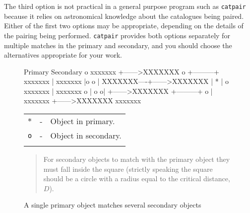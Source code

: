 \documentclass[twoside,11pt]{starlink}
\begin{document}
The third option is not practical in a general purpose program such as
\texttt{catpair} because it relies on astronomical knowledge about the
catalogues being paired. Either of the first two options may be
appropriate, depending on the details of the pairing being performed.
\texttt{catpair} provides both options separately for multiple matches in
the primary and secondary, and you should choose the alternatives
appropriate for your work.

\begin{figure}[htbp]

\begin{terminalv}
                                        Primary           Secondary
                         o              xxxxxxx    +------>XXXXXXX
            o    +---------+            xxxxxxx    |       xxxxxxx
                 |o     o  |            XXXXXXX----+------>XXXXXXX
                 |    *    |  o         xxxxxxx    |       xxxxxxx
             o   |  o     o|                       +------>XXXXXXX
                 +---------+   o                   |       xxxxxxx
                                                   +------>XXXXXXX
                                                           xxxxxxx
\end{terminalv}

\begin{center}
\begin{tabular}{lll}
{$\ast$} & -  & Object in primary.   \\
\texttt{o}  & -  & Object in secondary. \\
    &  &  \\
\end{tabular}

\begin{quote}
For secondary objects to match with the primary object they must fall
inside the square (strictly speaking the square should be a circle with
a radius equal to the critical distance, $D$).
\end{quote}
\end{center}

\caption{A single primary object matches several secondary objects
\label{PAIR_PRIM_MULT} }

\end{figure}
\end{document}
